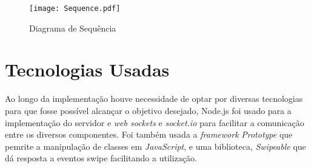 \begin{figure}[ht]
\centering
\texttt{[image: Sequence.pdf]}
\caption[\textit{Diagrama de Sequência}] {Diagrama de Sequência}
\label{fig:sequencia}
\end{figure}


\section{Tecnologias Usadas} \label{sec:tec}

Ao longo da implementação houve necessidade de optar por diversas tecnologias para que fosse possível alcançar o objetivo desejado, Node.js foi usado para a implementação do servidor e \textit{web sockets} e \textit{socket.io} para facilitar a comunicação entre os diversos componentes. Foi também usada a \textit{framework} \textit{Prototype} que pemrite a manipulação de classes em \textit{JavaScript}, e uma biblioteca, \textit{Swipeable} que dá resposta a eventos swipe facilitando a utilização.

